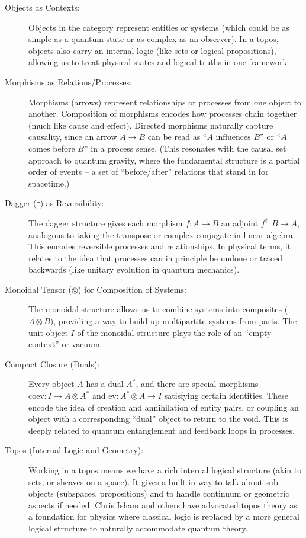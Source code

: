 \documentclass{article}
\begin{document}
\begin{description}
\item[Objects as Contexts:] Objects in the category represent entities or systems (which could be as simple as a quantum state or as complex as an observer). In a topos, objects also carry an internal logic (like sets or logical propositions), allowing us to treat physical states and logical truths in one framework.

\item[Morphisms as Relations/Processes:] Morphisms (arrows) represent relationships or processes from one object to another. Composition of morphisms encodes how processes chain together (much like cause and effect). Directed morphisms naturally capture causality, since an arrow $A \to B$ can be read as ``$A$ influences $B$'' or ``$A$ comes before $B$'' in a process sense. (This resonates with the causal set approach to quantum gravity, where the fundamental structure is a partial order of events -- a set of ``before/after'' relations that stand in for spacetime\cite{bombelli1987}.)

\item[Dagger ($\dagger$) as Reversibility:] The dagger structure gives each morphism $f: A \to B$ an adjoint $f^\dagger: B \to A$, analogous to taking the transpose or complex conjugate in linear algebra. This encodes reversible processes and relationships. In physical terms, it relates to the idea that processes can in principle be undone or traced backwards (like unitary evolution in quantum mechanics).

\item[Monoidal Tensor ($\otimes$) for Composition of Systems:] The monoidal structure allows us to combine systems into composites ($A \otimes B$), providing a way to build up multipartite systems from parts. The unit object $I$ of the monoidal structure plays the role of an ``empty context'' or vacuum.

\item[Compact Closure (Duals):] Every object $A$ has a dual $A^*$, and there are special morphisms $\text{coev}: I \to A \otimes A^*$ and $\text{ev}: A^* \otimes A \to I$ satisfying certain identities. These encode the idea of creation and annihilation of entity pairs, or coupling an object with a corresponding ``dual'' object to return to the void. This is deeply related to quantum entanglement and feedback loops in processes.

\item[Topos (Internal Logic and Geometry):] Working in a topos means we have a rich internal logical structure (akin to sets, or sheaves on a space). It gives a built-in way to talk about sub-objects (subspaces, propositions) and to handle continuum or geometric aspects if needed. Chris Isham and others have advocated topos theory as a foundation for physics where classical logic is replaced by a more general logical structure to naturally accommodate quantum theory\cite{doering2008}.
\end{description}
\end{document}
